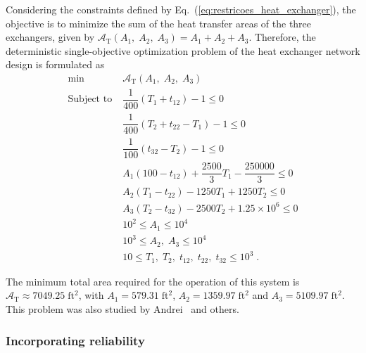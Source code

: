\documentclass[final,5p,times,twocolumn,numbers]{elsarticle}
\begin{document}
Considering the constraints defined by Eq.~(\ref{eq:restricoes_heat_exchanger}), the objective is to minimize the sum of the heat transfer areas of the three exchangers, given by $ \mathcal{A}_{\mathrm{T}} \left( A_{1}, \; A_{2}, \; A_{3} \right) = A_{1} + A_{2} + A_{3} $. Therefore, the deterministic single-objective optimization problem of the heat exchanger network design is formulated as
%
\begin{equation*}
\begin{split}
\min \; &\mathcal{A}_{\mathrm{T}} \left( A_{1}, \; A_{2}, \; A_{3} \right)\\
\textrm{Subject to} \; &\dfrac{1}{400} \left( T_{1} + t_{12} \right) - 1 \leq 0\\
\phantom{Subject to} \; &\dfrac{1}{400} \left( T_{2} + t_{22} - T_{1} \right) - 1 \leq 0\\
\phantom{Subject to} \; &\dfrac{1}{100} \left(t_{32} - T_{2} \right) - 1 \leq 0\\
\phantom{Subject to} \; &A_{1} \left( 100 - t_{12} \right) + \dfrac{2500}{3} T_{1} - \dfrac{250000}{3} \leq 0\\
\phantom{Subject to} \; &A_{2} \left( T_{1} - t_{22} \right) - 1250 T_{1} + 1250 T_{2} \leq 0\\
\phantom{Subject to} \; &A_{3} \left( T_{2} - t_{32} \right) - 2500 T_{2} + 1.25 \times 10^{6} \leq 0\\
\phantom{Subject to} \; &10^{2} \leq A_{1} \leq 10^{4}\\
\phantom{Subject to} \; &10^{3} \leq A_{2}, \; A_{3} \leq 10^{4}\\
\phantom{Subject to} \; &10 \leq T_{1}, \; T_{2}, \; t_{12}, \; t_{22}, \; t_{32} \leq 10^{3} \; .
\end{split}
\end{equation*}

\noindent The minimum total area required for the operation of this system is $ \mathcal{A}_{\mathrm{T}} \approx 7049.25 \; \mathrm{ft^{2}} $, with $ A_{1} = 579.31 \; \mathrm{ft^{2}} $, $ A_{2} = 1359.97 \; \mathrm{ft^{2}} $ and $ A_{3} = 5109.97 \; \mathrm{ft^{2}} $. This problem was also studied by Andrei~\cite{bib:andrei2013} and others.

\subsubsection{Incorporating reliability}
\end{document}
